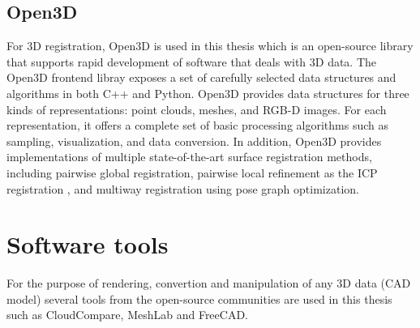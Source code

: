 \subsection{Open3D}

For 3D registration, Open3D is used in this thesis which is an open-source library that supports rapid development of software that deals with 3D data. The Open3D frontend libray exposes a set of carefully selected data structures and algorithms in both C++ and Python. Open3D provides data structures for three kinds of representations: point clouds, meshes, and RGB-D images.  For each representation, it offers a complete set of basic processing algorithms such as sampling, visualization, and data conversion. In addition, Open3D  provides  implementations  of  multiple  state-of-the-art surface registration methods, including pairwise global registration, pairwise local refinement as the ICP registration \cite{icp}, and multiway registration  using  pose  graph  optimization. 

\section{Software tools}
For the purpose of rendering, convertion and manipulation of any 3D data (CAD model) several tools from the open-source communities are used in this thesis such as CloudCompare, MeshLab and FreeCAD. 


